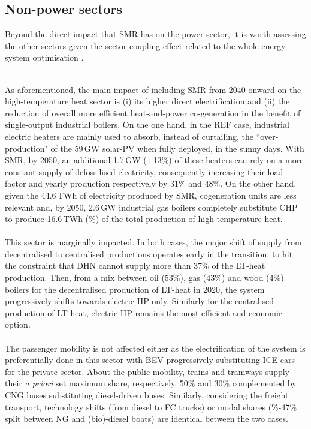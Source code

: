 \subsection{Non-power sectors}
\label{subsec:atom_mol:results_deter_others}

Beyond the direct impact that \gls{SMR} has on the power sector, it is worth assessing the other sectors given the sector-coupling effect related to the whole-energy system optimisation \cite{contino2020whole}.

\\

As aforementioned, the main impact of including \gls{SMR} from 2040 onward on the high-temperature heat sector is (i) its higher direct electrification and (ii) the reduction of overall more efficient heat-and-power co-generation in the benefit of single-output industrial boilers. On the one hand, in the REF case, industrial electric heaters are mainly used to absorb, instead of curtailing, the ``over-production" of the 59\,GW solar-PV when fully deployed, in the sunny days. With \gls{SMR}, by 2050, an additional 1.7\,GW (+13\%) of these heaters can rely on a more constant supply of defossilised electricity, consequently increasing their load factor and yearly production respectively by 31\% and 48\%. On the other hand, given the 44.6\,TWh of electricity produced by \gls{SMR}, cogeneration units are less relevant and, by 2050, 2.6\,GW industrial gas boilers completely substitute \gls{CHP} to produce 16.6\,TWh (\%) of the total production of high-temperature heat.\\

\\

This sector is marginally impacted. In both cases, the major shift of supply from decentralised to centralised productions operates early in the transition, to hit the constraint that \gls{DHN} cannot supply more than 37\% of the \gls{LT}-heat production. Then, from a mix between oil (53\%), gas (43\%) and wood (4\%) boilers for the decentralised production of \gls{LT}-heat in 2020, the system progressively shifts towards electric \gls{HP} only. Similarly for the centralised production of \gls{LT}-heat, electric \gls{HP} remains the most efficient and economic option.\\

\\

The passenger mobility is not affected either as the electrification of the system is preferentially done in this sector with \gls{BEV} progressively substituting \gls{ICE} cars for the private sector. About the public mobility, trains and tramways supply their \textit{a priori} set maximum share, respectively, 50\% and 30\% complemented by \gls{CNG} buses substituting diesel-driven buses. Similarly, considering the freight transport, technology shifts (\ie from diesel to \gls{FC} trucks) or modal shares (\%-47\% split between \gls{NG} and (bio)-diesel boats) are identical between the two cases.\\

